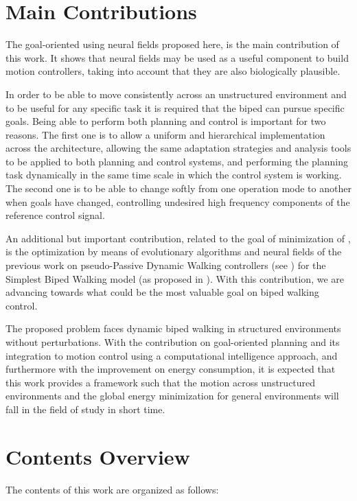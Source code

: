 \section{Main Contributions}
The goal-oriented  using neural fields
proposed here, is the main contribution of this work. It shows that
neural fields may be used as a useful component to build motion
controllers, taking into account that they are also biologically
plausible.

In order to be able to move consistently across an unstructured
environment and to be useful for any specific task it is required that
the biped can pursue specific goals. Being able to perform both
planning and control is important for two reasons. The first one is to
allow a uniform and hierarchical implementation across the
architecture, allowing the same adaptation strategies and analysis
tools to be applied to both planning and control systems, and
performing the planning task dynamically in the same time scale in
which the control system is working. The second one is to be able to
change softly from one operation mode to another when goals have
changed, controlling undesired high frequency components of the
reference control signal.

An additional but important contribution, related to the goal of
minimization of \!, is the
optimization by means of evolutionary algorithms and neural fields of
the previous work on pseudo-Passive Dynamic Walking controllers (see
\cite{Wisse05How}) for the Simplest Biped Walking model (as proposed
in \cite{Garcia98simplest}). With this contribution, we are advancing
towards what could be the most valuable goal on biped walking control.

The proposed problem faces dynamic biped walking in structured
environments without perturbations. With the contribution on
goal-oriented planning and its integration to motion control using a
computational intelligence approach, and furthermore with the
improvement on energy consumption, it is expected that this work
provides a framework such that the motion across unstructured
environments and the global energy minimization for general
environments will fall in the field of study in short time.

\section{Contents Overview}
The contents of this work are organized as follows:

